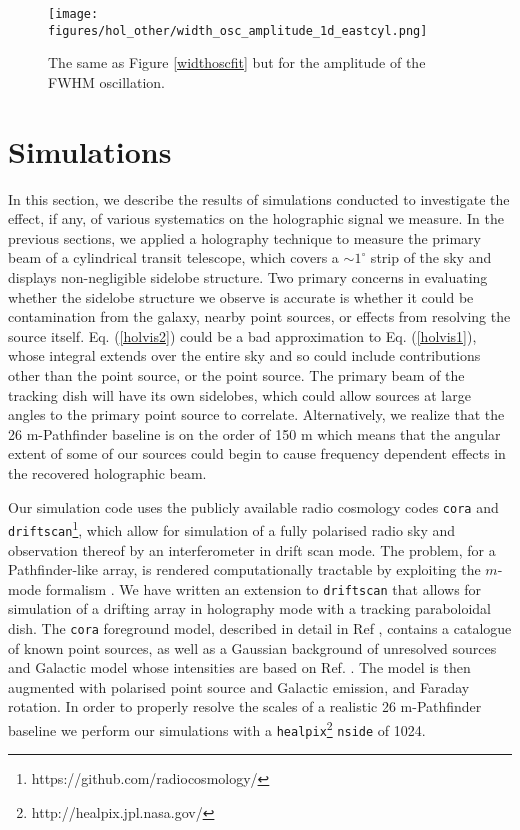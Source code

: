 \begin{figure}[h!]
\begin{center}
\texttt{[image: figures/hol\_other/width\_osc\_amplitude\_1d\_eastcyl.png]}
\caption{The same as Figure \ref{widthoscfit} but for the amplitude of the FWHM oscillation.}
\label{amposcfit}
\end{center}
\end{figure}

\section{Simulations} \label{ch:hol:sec:sims}

In this section, we describe the results of simulations conducted to investigate the effect, if any, of various systematics on the holographic signal we measure. In the previous sections, we applied a holography technique to measure the primary beam of a cylindrical transit telescope, which covers a $\sim 1^{\circ}$ strip of the sky and displays non-negligible sidelobe structure. Two primary concerns in evaluating whether the sidelobe structure we observe is accurate is whether it could be contamination from the galaxy, nearby point sources, or effects from resolving the source itself. Eq. (\ref{holvis2}) could be a bad approximation to Eq. (\ref{holvis1}), whose integral extends over the entire sky and so could include contributions other than the point source, or the point source. The primary beam of the tracking dish will have its own sidelobes, which could allow sources at large angles to the primary point source to correlate. Alternatively, we realize that the 26 m-Pathfinder baseline is on the order of 150 m which means that the angular extent of some of our sources could begin to cause frequency dependent effects in the recovered holographic beam. 

Our simulation code uses the publicly available radio cosmology codes \texttt{cora} and \texttt{driftscan}\footnote{https://github.com/radiocosmology/}, which allow for simulation of a fully polarised radio sky and observation thereof by an interferometer in drift scan mode. The problem, for a Pathfinder-like array, is rendered computationally tractable by exploiting the $m$-mode formalism \citep{mmodes1, mmodes2}. We have written an extension to \texttt{driftscan} that allows for simulation of a drifting array in holography mode with a tracking paraboloidal dish. The \texttt{cora} foreground model, described in detail in Ref \citep{mmodes2}, contains a catalogue of known point sources, as well as a Gaussian background of unresolved sources and Galactic model whose intensities are based on Ref. \citep{santoscoorayknox}. The model is then augmented with polarised point source and Galactic emission, and Faraday rotation. In order to properly resolve the scales of a realistic 26 m-Pathfinder baseline we perform our simulations with a \texttt{healpix}\footnote{http://healpix.jpl.nasa.gov/} \citep{gorski} \texttt{nside} of 1024.


